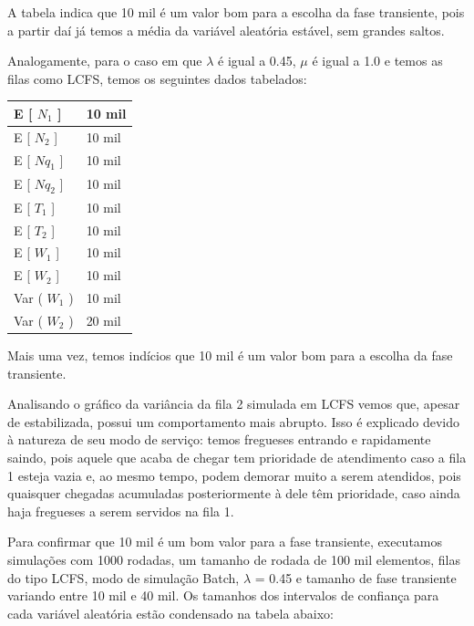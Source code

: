 \documentclass[a4paper,10pt]{article}
\begin{document}
    A tabela indica que 10 mil é um valor bom para a escolha da fase transiente, pois a partir daí já temos a média da variável aleatória estável, sem grandes saltos.

    Analogamente, para o caso em que $\lambda$ é igual a 0.45, $\mu$ é igual a 1.0 e temos as filas como LCFS, temos os seguintes dados tabelados:

\begin{center}
\begin{tabular} { | l | l | }
    \hline
    E [ $N_1$ ]  & 10 mil \\ \hline
    E [ $N_2$ ] & 10 mil \\ \hline
    E [ $Nq_1$ ] & 10 mil \\ \hline
    E [ $Nq_2$ ]	& 10 mil \\ \hline
    E [ $T_1$ ] & 10 mil \\ \hline
    E [ $T_2$ ] & 10 mil \\ \hline
    E [ $W_1$ ] & 10 mil \\ \hline
    E [ $W_2$ ] & 10 mil \\ \hline
    Var ( $W_1$ ) & 10 mil \\ \hline
    Var ( $W_2$ ) & 20 mil \\ \hline
\end{tabular}
\end{center}

    Mais uma vez, temos indícios que 10 mil é um valor bom para a escolha da fase transiente.

    Analisando o gráfico da variância da fila 2 simulada em LCFS vemos que, apesar de estabilizada, possui um comportamento mais abrupto. Isso é explicado devido à natureza de seu modo de serviço: temos fregueses entrando e rapidamente saindo, pois aquele que acaba de chegar tem prioridade de atendimento caso a fila 1 esteja vazia e, ao mesmo tempo, podem demorar muito a serem atendidos, pois quaisquer chegadas acumuladas posteriormente à dele têm prioridade, caso ainda haja fregueses a serem servidos na fila 1.

    Para confirmar que 10 mil é um bom valor para a fase transiente, executamos simulações com 1000 rodadas, um tamanho de rodada de 100 mil elementos, filas do tipo LCFS, modo de simulação Batch, $\lambda$ = 0.45 e tamanho de fase transiente variando entre 10 mil e 40 mil. Os tamanhos dos intervalos de confiança para cada variável aleatória estão condensado na tabela abaixo:
\end{document}
